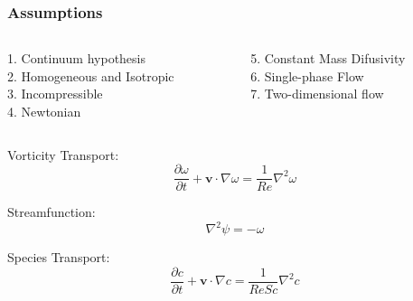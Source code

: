 \begin{frame} 
 \frametitle{\Large Assumptions}
\vspace{-1cm}
\begin{center}
\begin{columns}[c]
\begin{column}{0.6\textwidth} 
\hspace{1cm}  1. Continuum hypothesis\\[0.1cm]
\hspace{1cm}  2. Homogeneous and Isotropic\\[0.1cm]
\hspace{1cm}  3. Incompressible\\[0.1cm]
\hspace{1cm}  4. Newtonian
\end{column}
\begin{column}{0.6\textwidth}
\hspace{0.5cm}  5. Constant Mass Difusivity\\[0.1cm]
\hspace{0.5cm}  6. Single-phase Flow\\[0.1cm]
\hspace{0.5cm}  7. Two-dimensional flow
\end{column}
\end{columns}
\end{center}
\small

\medskip
Vorticity Transport:
\begin{equation*}
 \frac{\partial \omega}{\partial t} + \textbf{v} \cdot \nabla \omega = \frac{1}{Re} \nabla^{2} \omega
\end{equation*}

\medskip
Streamfunction:
\begin{equation*} 
 \nabla^{2} \psi = - \omega
\end{equation*}

\medskip
Species Transport:
\begin{equation*}
 \frac{\partial c}{\partial t} + \textbf{v} \cdot \nabla c = \frac{1}{ReSc} \nabla^{2} c
\end{equation*} \\[0.8cm]

\end{frame}




